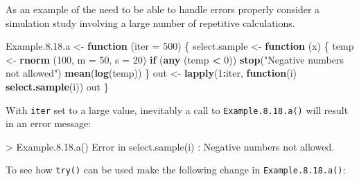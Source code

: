 \documentclass[
]{book}
\newenvironment{Shaded}{\begin{snugshade}}{\end{snugshade}}
\newcommand{\AttributeTok}[1]{\textcolor[rgb]{0.13,0.29,0.53}{#1}}
\newcommand{\ControlFlowTok}[1]{\textcolor[rgb]{0.13,0.29,0.53}{\textbf{#1}}}
\newcommand{\DecValTok}[1]{\textcolor[rgb]{0.00,0.00,0.81}{#1}}
\newcommand{\FloatTok}[1]{\textcolor[rgb]{0.00,0.00,0.81}{#1}}
\newcommand{\FunctionTok}[1]{\textcolor[rgb]{0.13,0.29,0.53}{\textbf{#1}}}
\newcommand{\NormalTok}[1]{#1}
\newcommand{\OtherTok}[1]{\textcolor[rgb]{0.56,0.35,0.01}{#1}}
\newcommand{\SpecialCharTok}[1]{\textcolor[rgb]{0.81,0.36,0.00}{\textbf{#1}}}
\newcommand{\StringTok}[1]{\textcolor[rgb]{0.31,0.60,0.02}{#1}}
\begin{document}
As an example of the need to be able to handle errors properly consider a simulation study involving a large number of repetitive calculations.

\begin{Shaded}
\begin{Highlighting}[]
\NormalTok{Example.}\DecValTok{8}\NormalTok{.}\FloatTok{18.}\NormalTok{a }\OtherTok{\textless{}{-}} \ControlFlowTok{function}\NormalTok{ (}\AttributeTok{iter =} \DecValTok{500}\NormalTok{)}
\NormalTok{\{ select.sample }\OtherTok{\textless{}{-}} \ControlFlowTok{function}\NormalTok{ (x) }
\NormalTok{  \{ temp }\OtherTok{\textless{}{-}} \FunctionTok{rnorm}\NormalTok{ (}\DecValTok{100}\NormalTok{, }\AttributeTok{m =} \DecValTok{50}\NormalTok{, }\AttributeTok{s =} \DecValTok{20}\NormalTok{)}
    \ControlFlowTok{if}\NormalTok{ (}\FunctionTok{any}\NormalTok{ (temp }\SpecialCharTok{\textless{}} \DecValTok{0}\NormalTok{)) }\FunctionTok{stop}\NormalTok{(}\StringTok{"Negative numbers not allowed"}\NormalTok{)}
    \FunctionTok{mean}\NormalTok{(}\FunctionTok{log}\NormalTok{(temp))                                                         \}}
\NormalTok{  out }\OtherTok{\textless{}{-}} \FunctionTok{lapply}\NormalTok{(}\DecValTok{1}\SpecialCharTok{:}\NormalTok{iter, }\ControlFlowTok{function}\NormalTok{(i) }\FunctionTok{select.sample}\NormalTok{(i))}
\NormalTok{  out}
\NormalTok{\}}
\end{Highlighting}
\end{Shaded}

With \texttt{iter} set to a large value, inevitably a call to \texttt{Example.8.18.a()} will result in an error message:

\begin{Shaded}
\begin{Highlighting}[]
\NormalTok{\textgreater{} Example.8.18.a()}
\NormalTok{Error in select.sample(i) : Negative numbers not allowed.}
\end{Highlighting}
\end{Shaded}

To see how \texttt{try()} can be used make the following change in \texttt{Example.8.18.a()}:
\end{document}
